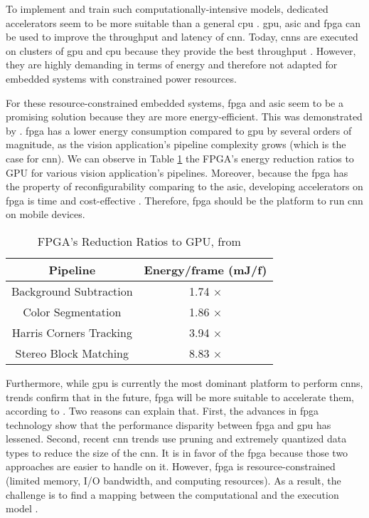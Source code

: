 To implement and train such computationally-intensive models, dedicated accelerators seem to be more suitable than a general \acrfull{cpu} \cite{liu_fpga-based_2019}. \acrfull{gpu}, \acrfull{asic} and \acrfull{fpga} can be used to improve the throughput and latency of \acrshort{cnn}. Today, \acrshort{cnn}s are executed on clusters of \acrshort{gpu} and \acrshort{cpu} because they provide the best throughput \cite{liu_uniform_2019}. However, they are highly demanding in terms of energy and therefore not adapted for embedded systems with constrained power resources.

For these resource-constrained embedded systems, \acrshort{fpga} and \acrshort{asic} seem to be a promising solution because they are more energy-efficient. This was demonstrated by \textcite{qasaimeh_comparing_2019}. \acrshort{fpga} has a lower energy consumption compared to \acrshort{gpu} by several orders of magnitude, as the vision application’s pipeline complexity grows (which is the case for \acrshort{cnn}). We can observe in Table \ref{tab:benchener} the FPGA’s energy reduction ratios to GPU for various vision application’s pipelines. Moreover, because the \acrshort{fpga} has the property of reconfigurability comparing to the \acrshort{asic}, developing accelerators on \acrshort{fpga} is time and cost-effective \cite{motamedi_placid_2017}. Therefore, \acrshort{fpga} should be the platform to run \acrshort{cnn} on mobile devices.
%
\begin{table}[H]
    \center
    \begin{tabular}{|c|c|}
        \hline
        Pipeline & Energy/frame (mJ/f) \\
        \hline
        Background Subtraction & 1.74 $\times$\\
        \hline
        Color Segmentation & 1.86 $\times$ \\
        \hline
        Harris Corners Tracking & 3.94 $\times$ \\
        \hline
        Stereo Block Matching & 8.83 $\times$ \\
        \hline
    \end{tabular}
    \caption{FPGA’s Reduction Ratios to GPU, from \cite{qasaimeh_comparing_2019}}
    \label{tab:benchener}
\end{table}

Furthermore, while \acrshort{gpu} is currently the most dominant platform to perform \acrshort{cnn}s, trends confirm that in the future, \acrshort{fpga} will be more suitable to accelerate them, according to \textcite{nurvitadhi_can_2017}. Two reasons can explain that. First, the advances in \acrshort{fpga} technology show that the performance disparity between \acrshort{fpga} and \acrshort{gpu} has lessened. Second, recent \acrshort{cnn} trends use pruning and extremely quantized data types to reduce the size of the \acrshort{cnn}. It is in favor of the \acrshort{fpga} because those two approaches are easier to handle on it. However, \acrshort{fpga} is resource-constrained (limited memory, I/O bandwidth, and computing resources). As a result, the challenge is to find a mapping between the computational and the execution model \cite{morcel_feathernet_2019}.


